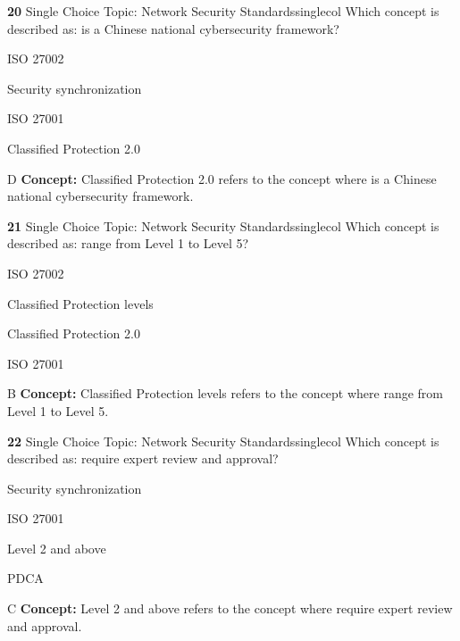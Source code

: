 \documentclass[10pt,a4paper]{article}
\begin{document}
\begin{qcard}{\color{white}\textbf{20} \hfill \small Single Choice \textbar{} Topic: Network Security Standards}{singlecol}
Which concept is described as: is a Chinese national cybersecurity framework?

\begin{qoptions}
\item ISO 27002
\item Security synchronization
\item ISO 27001
\item Classified Protection 2.0
\end{qoptions}
\begin{explainbox}{D}
\textbf{Concept:} Classified Protection 2.0 refers to the concept where is a Chinese national cybersecurity framework.
\end{explainbox}
\end{qcard}

\begin{qcard}{\color{white}\textbf{21} \hfill \small Single Choice \textbar{} Topic: Network Security Standards}{singlecol}
Which concept is described as: range from Level 1 to Level 5?

\begin{qoptions}
\item ISO 27002
\item Classified Protection levels
\item Classified Protection 2.0
\item ISO 27001
\end{qoptions}
\begin{explainbox}{B}
\textbf{Concept:} Classified Protection levels refers to the concept where range from Level 1 to Level 5.
\end{explainbox}
\end{qcard}

\begin{qcard}{\color{white}\textbf{22} \hfill \small Single Choice \textbar{} Topic: Network Security Standards}{singlecol}
Which concept is described as: require expert review and approval?

\begin{qoptions}
\item Security synchronization
\item ISO 27001
\item Level 2 and above
\item PDCA
\end{qoptions}
\begin{explainbox}{C}
\textbf{Concept:} Level 2 and above refers to the concept where require expert review and approval.
\end{explainbox}
\end{qcard}
\end{document}
